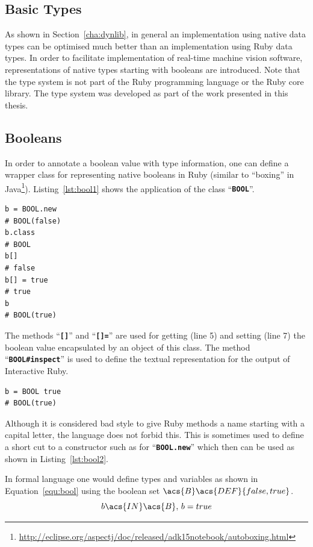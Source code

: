 \documentclass[12pt,a4paper,oneside,openright]{book}
\newcommand{\sct}[1]{Section~\ref{cha:#1}}
\newcommand{\equ}[1]{Equation~\ref{equ:#1}}
\newcommand{\lst}[1]{Listing~\ref{lst:#1}}
\newcommand{\code}[1]{``\texttt{\textbf{\textcolor{codegray}{\small{#1}}}}''}
\begin{document}
\begin{CJK}{UTF8}{}
\section{Basic Types}\label{cha:basictypes}
As shown in \sct{dynlib}, in general an implementation using native data types can be optimised much better than an implementation using Ruby data types. In order to facilitate implementation of real-time machine vision software, representations of native types starting with booleans are introduced. Note that the type system is not part of the Ruby programming language or the Ruby core library. The type system was developed as part of the work presented in this thesis.

\subsection{Booleans}
In order to annotate a boolean value with type information, one can define a wrapper class for representing native booleans in Ruby (similar to ``boxing'' in Java\footnote{\url{http://eclipse.org/aspectj/doc/released/adk15notebook/autoboxing.html}}). \lst{bool1} shows the application of the class \code{BOOL}.
\lstset{language=Ruby,frame=single,numbers=left}
\begin{lstlisting}[float=htbp,caption={Boxing booleans},escapechar=\$,label=lst:bool1]
b = BOOL.new
# BOOL(false)
b.class
# BOOL
b[]
# false
b[] = true
# true
b
# BOOL(true)
\end{lstlisting}
The methods \code{[]} and \code{[]=} are used for getting (line 5) and setting (line 7) the boolean value encapsulated by an object of this class. The method \code{BOOL\#inspect} is used to define the textual representation for the output of Interactive Ruby.

\lstset{language=Ruby,frame=single,numbers=none}
\begin{lstlisting}[float=htbp,caption={Constructor short cut},escapechar=\$,label=lst:bool2]
b = BOOL true
# BOOL(true)
\end{lstlisting}
Although it is considered bad style to give Ruby methods a name starting with a capital letter, the language does not forbid this. This is sometimes used to define a short cut to a constructor such as for \code{BOOL.new} which then can be used as shown in \lst{bool2}.

In formal language one would define types and variables as shown in \equ{bool} using the boolean set $\acs{B}\acs{DEF}\{false,true\}$.
\begin{equation}\label{equ:bool}
  b\acs{IN}\acs{B}\mathrm{,\ }b=true
\end{equation}


\end{CJK}
\end{document}
